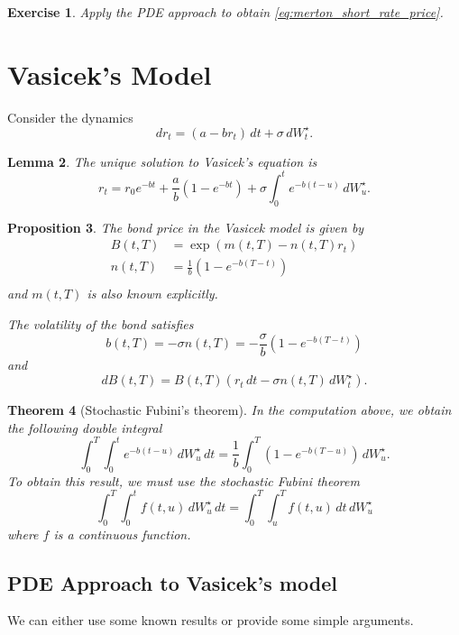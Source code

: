 \documentclass[10pt, oneside, reqno]{amsbook}
\theoremstyle{plain}%
\newtheorem{thm}{Theorem}[chapter]
\newtheorem{lem}[thm]{Lemma}
\newtheorem{prop}[thm]{Proposition}
\newtheorem{exer}[thm]{Exercise}
\theoremstyle{definition}
\theoremstyle{rem}
\theoremstyle{definition}
\numberwithin{equation}{chapter}
\begin{document}
    \begin{exer}
        Apply the PDE approach to obtain \eqref{eq:merton_short_rate_price}.
    \end{exer}
    
\section{Vasicek's Model} %
\label{sub:vasicek_s_model}
Consider the dynamics \begin{equation}
    dr_t = (a - br_t) \, dt + \sigma \, dW^\star_t.
    \label{eq:vasicek_short_rate_dynamics}
\end{equation}

\begin{lem}
    The unique solution to Vasicek's equation is \begin{equation}
        r_t = r_0 e^{-bt} + \frac{a}{b}\left(1-e^{-bt} \right) + \sigma \int_0^t e^{-b(t-u)} \, dW^\star_u.
    \end{equation}
\end{lem}

\begin{prop}
    The bond price in the Vasicek model is given by \begin{align*}
        B(t, T) &= \exp(m(t, T) - n(t, T) r_t) \\
        n(t, T) &= \frac{1}{b}\left(1- e^{-b(T-t)} \right) \\
    \end{align*} and $m(t, T)$ is also known explicitly.
    
    The volatility of the bond satisfies \[
        b(t, T) = -\sigma n(t, T) = -\frac{\sigma}{b}\left(1 -e^{-b(T-t)} \right)
    \] and \[
        dB(t, T) = B(t, T) \left(r_t \, dt - \sigma n(t, T) \, dW^\star_t \right).
    \]
\end{prop}

\begin{thm}[Stochastic Fubini's theorem]
    In the computation above, we obtain the following double integral \[
        \int_0^T \int_0^t e^{-b(t-u)} \, dW^\star_u \, dt = \frac{1}{b} \int_0^T \left(1-e^{-b(T-u)} \right) \, dW^\star_u.
    \]   To obtain this result, we must use the stochastic Fubini theorem \[
        \int_0^T \int_0^t f(t, u) \, dW^\star_u \, dt = \int_0^T \int_u^T f(t, u) \, dt \, dW^\star_u
    \] where $f$ is a continuous function.

\end{thm}

\subsection{PDE Approach to Vasicek's model} %
\label{sub:pde_approach_to_vasicek_s_model}
We can either use some known results or provide some simple arguments.  
\end{document}
